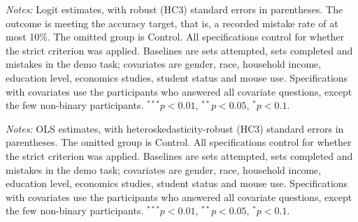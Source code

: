\documentclass[12pt, letterpaper]{article}
\begin{document}
\begin{table}
\centering
\begin{threeparttable}

\begin{tablenotes}[flushleft]
\footnotesize
\item \textit{Notes:} Logit estimates, with robust (HC3) standard errors in parentheses. The outcome is meeting the accuracy target, that is, a recorded mistake rate of at most 10\%. The omitted group is Control. All specifications control for whether the strict criterion was applied. Baselines are sets attempted, sets completed and mistakes in the demo task; covariates are gender, race, household income, education level, economics studies, student status and mouse use. Specifications with covariates use the participants who answered all covariate questions, except the few non-binary participants. $^{***}p<0.01$, $^{**}p<0.05$, $^{*}p<0.1$.
\end{tablenotes}
\end{threeparttable}
\caption{Treatment effects on accuracy target achivement likelihood (pooled sample)}\label{tab:reg-target}
\end{table}

\begin{table}
\centering
\begin{threeparttable}

\begin{tablenotes}[flushleft]
\footnotesize
\item \textit{Notes:} OLS estimates, with heteroskedasticity-robust (HC3) standard errors in parentheses. The omitted group is Control. All specifications control for whether the strict criterion was applied. Baselines are sets attempted, sets completed and mistakes in the demo task; covariates are gender, race, household income, education level, economics studies, student status and mouse use. Specifications with covariates use the participants who answered all covariate questions, except the few non-binary participants. $^{***}p<0.01$, $^{**}p<0.05$, $^{*}p<0.1$.
\end{tablenotes}
\end{threeparttable}
\caption{Treatment effects on mistake rate (pooled sample)}\label{tab:reg-mistakes}
\end{table}
\end{document}
